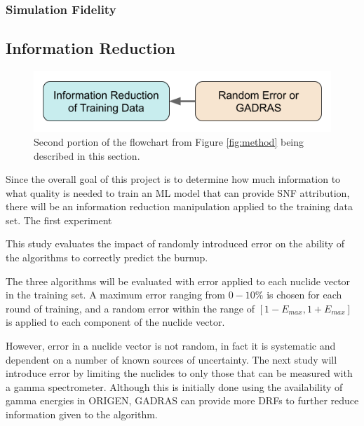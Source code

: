 \subsubsection{Simulation Fidelity}
\label{sec:fidelity}


\subsection{Information Reduction}
\label{sec:inforeduc}

\begin{figure}[H]
  \centering
  \includegraphics[width=0.7\linewidth]{./chapters/method/methodology2.png}
  \caption{Second portion of the flowchart from Figure \ref{fig:method} being 
           described in this section.}
\end{figure}

Since the overall goal of this project is to determine how much information to
what quality is needed to train an \gls{ML} model that can provide \gls{SNF}
attribution, there will be an information reduction manipulation applied to the
training data set. The first experiment 

This study evaluates
the impact of randomly introduced error on the ability of the algorithms to
correctly predict the burnup. 

The three algorithms will be evaluated with error applied to each nuclide
vector in the training set.  A maximum error ranging from $0 - 10\%$ is chosen
for each round of training, and a random error within the range of $[1-E_{max},
1+E_{max}]$ is applied to each component of the nuclide vector.

However, error in a nuclide vector is not random, in fact it is systematic and
dependent on a number of known sources of uncertainty. The next study will
introduce error by limiting the nuclides to only those that can be measured
with a gamma spectrometer. Although this is initially done using the
availability of gamma energies in \gls{ORIGEN}, \gls{GADRAS} can provide more
\gls{DRF}s to further reduce information given to the algorithm.

